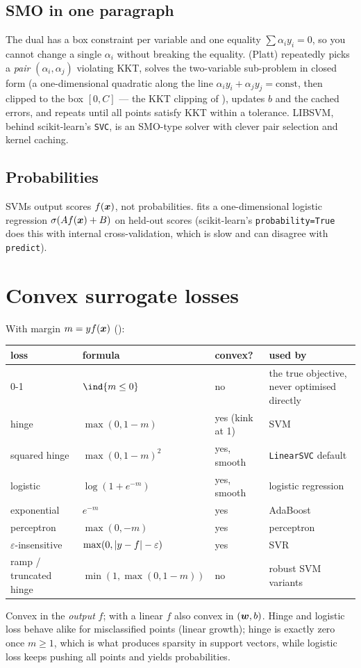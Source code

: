 \subsection{SMO in one paragraph}
The dual has a box constraint per variable and one equality $\sum\alpha_iy_i=0$, so you cannot
change a single $\alpha_i$ without breaking the equality. 
(Platt) repeatedly picks a \emph{pair} $(\alpha_i,\alpha_j)$ violating KKT, solves the
two-variable sub-problem in closed form (a one-dimensional quadratic along the line
$\alpha_iy_i+\alpha_jy_j=\text{const}$, then clipped to the box $[0,C]$ --- the KKT clipping of
), updates $b$ and the cached errors, and repeats until all points satisfy KKT within
a tolerance. LIBSVM, behind scikit-learn's \texttt{SVC}, is an SMO-type solver with clever pair
selection and kernel caching.

\subsection{Probabilities}
SVMs output scores $f({\bm{x}})$, not probabilities.  fits a one-dimensional
logistic regression $\sigma(Af({\bm{x}})+B)$ on held-out scores (scikit-learn's \texttt{probability=True}
does this with internal cross-validation, which is slow and can disagree with \texttt{predict}).

\section{Convex surrogate losses}
With margin $m=yf({\bm{x}})$ ():
\begin{center}
	\small
	\begin{tabularx}{\linewidth}{l l l >{\raggedright\arraybackslash}X}
		\toprule
		loss & formula & convex? & used by \\ \midrule
		0-1 & $\ind{m\le0}$ & no & the true objective, never optimised directly \\
		hinge & $\max(0,1-m)$ & yes (kink at 1) & SVM \\
		squared hinge & $\max(0,1-m)^2$ & yes, smooth & \texttt{LinearSVC} default \\
		logistic & $\log(1+e^{-m})$ & yes, smooth & logistic regression \\
		exponential & $e^{-m}$ & yes & AdaBoost \\
		perceptron & $\max(0,-m)$ & yes & perceptron \\
		$\varepsilon$-insensitive & $\max(0,\left\lvert y-f \right\rvert-\varepsilon)$ & yes & SVR \\
		ramp / truncated hinge & $\min(1,\max(0,1-m))$ & no & robust SVM variants \\
		\bottomrule
	\end{tabularx}
\end{center}
Convex in the \emph{output} $f$; with a linear $f$ also convex in $({\bm{w}},b)$. Hinge and logistic loss
behave alike for misclassified points (linear growth); hinge is exactly zero once $m\ge1$, which is
what produces sparsity in support vectors, while logistic loss keeps pushing all points and yields
probabilities.

